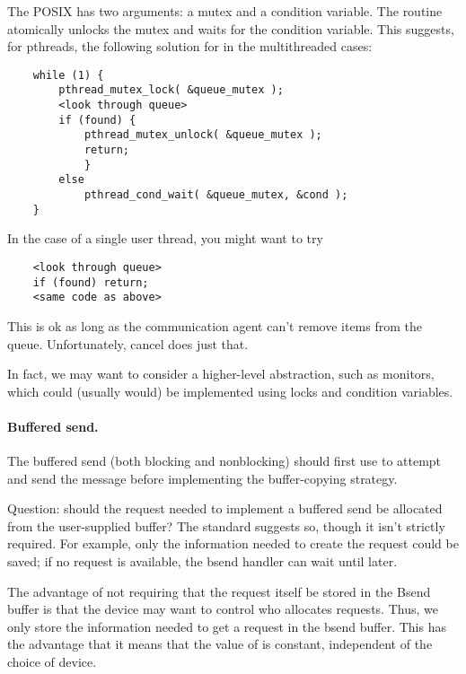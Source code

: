 \documentclass{article}
\begin{document}
\begin{mmadi}

The POSIX  has two arguments: a mutex and a condition
variable.  The routine atomically unlocks the mutex and waits for the
condition variable. This suggests, for pthreads, the following solution for
 in the multithreaded cases:
\begin{verbatim}
    while (1) {
        pthread_mutex_lock( &queue_mutex );
        <look through queue>
        if (found) {
            pthread_mutex_unlock( &queue_mutex );
            return;
            }
        else 
            pthread_cond_wait( &queue_mutex, &cond );
    }
\end{verbatim}
In the case of a single user thread, you might want to try
\begin{verbatim}
    <look through queue>
    if (found) return;
    <same code as above>
\end{verbatim}
This is ok as long as the communication agent can't remove items from the
queue.  Unfortunately, cancel does just that.  

In fact, we may want to consider a higher-level abstraction, such as monitors,
which could (usually would) be implemented using locks and condition variables.
\end{mmadi}

\paragraph{Buffered send.}
The buffered send (both blocking and nonblocking) should first use
 to attempt 
and send the message before implementing the buffer-copying strategy.

Question: should the request needed to implement a buffered send be allocated
from the user-supplied buffer?  The standard suggests so, though it isn't
strictly required.  For example, only the information needed to create
the request could be saved; if no request is available, the bsend
handler can wait until later.

The advantage of not requiring that the request itself be stored in
the Bsend buffer is that the device may want to control who allocates
requests.  Thus, we only store the information needed to get a request
in the bsend buffer.  This has the advantage that it means that the
value of  is constant, independent of the
choice of device.
\end{document}
